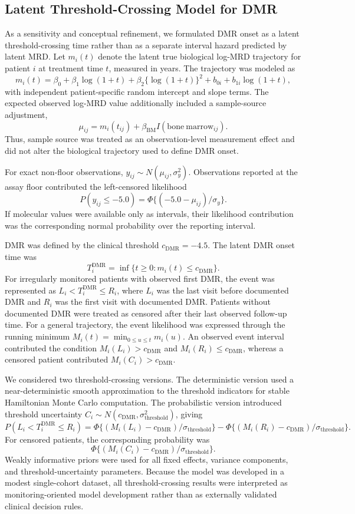 \subsection{Latent Threshold-Crossing Model for DMR}

As a sensitivity and conceptual refinement, we formulated DMR onset as a latent threshold-crossing time rather than as a separate interval hazard predicted by latent MRD. Let \(m_i(t)\) denote the latent true biological log-MRD trajectory for patient \(i\) at treatment time \(t\), measured in years. The trajectory was modeled as
\[
m_i(t)=\beta_0+\beta_1\log(1+t)+\beta_2\{\log(1+t)\}^2
+b_{0i}+b_{1i}\log(1+t),
\]
with independent patient-specific random intercept and slope terms. The expected observed log-MRD value additionally included a sample-source adjustment,
\[
\mu_{ij}=m_i(t_{ij})+\beta_{\mathrm{BM}}I(\mathrm{bone\ marrow}_{ij}).
\]
Thus, sample source was treated as an observation-level measurement effect and did not alter the biological trajectory used to define DMR onset.

For exact non-floor observations, \(y_{ij}\sim N(\mu_{ij},\sigma_y^2)\). Observations reported at the assay floor contributed the left-censored likelihood
\[
P(y_{ij}\leq -5.0)=
\Phi\{(-5.0-\mu_{ij})/\sigma_y\}.
\]
If molecular values were available only as intervals, their likelihood contribution was the corresponding normal probability over the reporting interval.

DMR was defined by the clinical threshold \(c_{\mathrm{DMR}}=-4.5\). The latent DMR onset time was
\[
T_i^{\mathrm{DMR}}=\inf\{t\geq 0:m_i(t)\leq c_{\mathrm{DMR}}\}.
\]
For irregularly monitored patients with observed first DMR, the event was represented as \(L_i<T_i^{\mathrm{DMR}}\leq R_i\), where \(L_i\) was the last visit before documented DMR and \(R_i\) was the first visit with documented DMR. Patients without documented DMR were treated as censored after their last observed follow-up time. For a general trajectory, the event likelihood was expressed through the running minimum \(M_i(t)=\min_{0\leq u\leq t}m_i(u)\). An observed event interval contributed the condition \(M_i(L_i)>c_{\mathrm{DMR}}\) and \(M_i(R_i)\leq c_{\mathrm{DMR}}\), whereas a censored patient contributed \(M_i(C_i)>c_{\mathrm{DMR}}\).

We considered two threshold-crossing versions. The deterministic version used a near-deterministic smooth approximation to the threshold indicators for stable Hamiltonian Monte Carlo computation. The probabilistic version introduced threshold uncertainty \(C_i\sim N(c_{\mathrm{DMR}},\sigma_{\mathrm{threshold}}^2)\), giving
\[
P(L_i<T_i^{\mathrm{DMR}}\leq R_i)
=
\Phi\{(M_i(L_i)-c_{\mathrm{DMR}})/\sigma_{\mathrm{threshold}}\}
-
\Phi\{(M_i(R_i)-c_{\mathrm{DMR}})/\sigma_{\mathrm{threshold}}\}.
\]
For censored patients, the corresponding probability was
\[
\Phi\{(M_i(C_i)-c_{\mathrm{DMR}})/\sigma_{\mathrm{threshold}}\}.
\]
Weakly informative priors were used for all fixed effects, variance components, and threshold-uncertainty parameters. Because the model was developed in a modest single-cohort dataset, all threshold-crossing results were interpreted as monitoring-oriented model development rather than as externally validated clinical decision rules.

